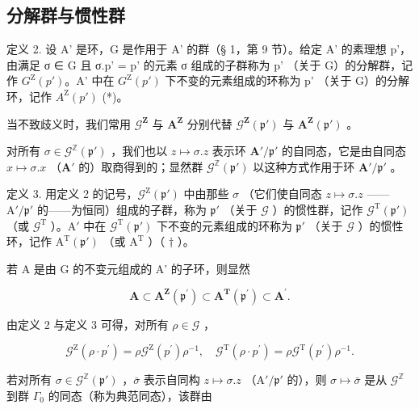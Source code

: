 \subsection{分解群与惯性群}

定义 2. 设 A' 是环，G 是作用于 A' 的群（§ 1，第 9 节）。给定 A' 的素理想 p'，由满足 σ ∈ G 且 σ.p' = p' 的元素 σ 组成的子群称为 p' （关于 G）的分解群，记作 \(G^{\mathrm{Z}}(p')\)。A' 中在 \(G^{\mathrm{Z}}(p')\) 下不变的元素组成的环称为 p' （关于 G）的分解环，记作 \(A^{\mathrm{Z}}(p')\) (*)。

  当不致歧义时，我们常用 \(\mathcal{G}^{\mathbf{Z}}\) 与 \(\mathbf{A}^{\mathbf{Z}}\) 分别代替 \(\mathcal{G}^{\mathbf{Z}}(\mathfrak{p}')\) 与 \(\mathbf{A}^{\mathbf{Z}}(\mathfrak{p}')\) 。

对所有 \(\sigma \in \mathcal{G}^{\mathbb{Z}}(\mathfrak{p}')\) ，我们也以 \(z \mapsto \sigma.z\) 表示环 \(\mathbf{A}' / \mathfrak{p}'\) 的自同态，它是由自同态 \(x \mapsto \sigma.x\) （\(\mathbf{A}'\) 的）取商得到的；显然群 \(\mathcal{G}^{\mathbb{Z}}(\mathfrak{p}')\) 以这种方式作用于环 \(\mathbf{A}' / \mathfrak{p}'\) 。

定义 3. 用定义 2 的记号，\(\mathcal{G}^{\mathrm{Z}}(\mathfrak{p}')\) 中由那些 \(\sigma\) （它们使自同态 \(z \mapsto \sigma.z\) ——\(\mathrm{A}' / \mathfrak{p}'\) 的——为恒同）组成的子群，称为 \(\mathfrak{p}'\) （关于 \(\mathcal{G}\) ）的惯性群，记作 \(\mathcal{G}^{\mathrm{T}}(\mathfrak{p}')\) （或 \(\mathcal{G}^{\mathrm{T}}\) ）。\(\mathrm{A}'\) 中在 \(\mathcal{G}^{\mathrm{T}}(\mathfrak{p}')\) 下不变的元素组成的环称为 \(\mathfrak{p}'\) （关于 \(\mathcal{G}\) ）的惯性环，记作 \(\mathrm{A}^{\mathrm{T}}(\mathfrak{p}')\) （或 \(\mathrm{A}^{\mathrm{T}}\) ）（ \(\dagger\) ）。

若 A 是由 G 的不变元组成的 A' 的子环，则显然

\[
\mathbf {A} \subset \mathbf {A} ^ {\mathbf {Z}} (\mathfrak {p} ^ {\prime}) \subset \mathbf {A} ^ {\mathbf {T}} (\mathfrak {p} ^ {\prime}) \subset \mathbf {A} ^ {\prime}.\tag{1}
\]

由定义 2 与定义 3 可得，对所有 \(\rho \in \mathcal{G}\) ，

\[
\mathcal {G} ^ {\mathrm{Z}} (\rho \cdot p ^ {\prime}) = \rho \mathcal {G} ^ {\mathrm{Z}} (p ^ {\prime}) \rho^ {- 1}, \quad \mathcal {G} ^ {\mathrm{T}} (\rho \cdot p ^ {\prime}) = \rho \mathcal {G} ^ {\mathrm{T}} (p ^ {\prime}) \rho^ {- 1}.\tag{2}
\]

若对所有 \(\sigma \in \mathcal{G}^{\mathbb{Z}}(\mathfrak{p}')\) ，\(\bar{\sigma}\) 表示自同构 \(z \mapsto \sigma. z\) （\(\mathrm{A}' / \mathfrak{p}'\) 的），则 \(\sigma \mapsto \bar{\sigma}\) 是从 \(\mathcal{G}^{\mathbb{Z}}\) 到群 \(\Gamma_0\) 的同态（称为典范同态），该群由

